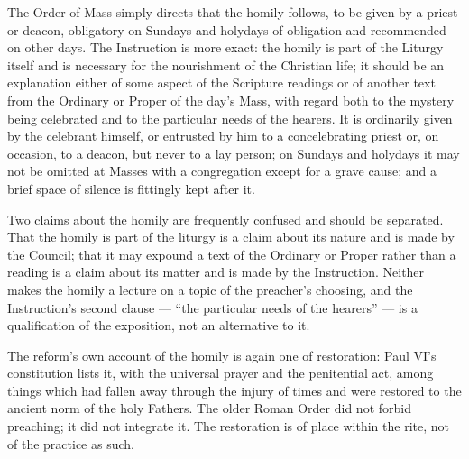 The Order of Mass simply directs that the homily follows, to be given by a priest or deacon,
obligatory on Sundays and holydays of obligation and recommended on other days. The Instruction is more exact: the homily is part of the Liturgy itself and is
necessary for the nourishment of the Christian life; it should be an explanation either of some
aspect of the Scripture readings or of another text from the Ordinary or Proper of the day's
Mass, with regard both to the mystery being celebrated and to the particular needs of the
hearers. It is ordinarily given by the celebrant himself, or entrusted by him to a
concelebrating priest or, on occasion, to a deacon, but never to a lay person; on Sundays and
holydays it may not be omitted at Masses with a congregation except for a grave cause; and a
brief space of silence is fittingly kept after it.

Two claims about the homily are frequently confused and should be separated. That the homily is
part of the liturgy is a claim about its nature and is made by the Council; that it may expound
a text of the Ordinary or Proper rather than a reading is a claim about its matter and is made
by the Instruction. Neither makes the homily a lecture on a topic of the preacher's choosing,
and the Instruction's second clause --- ``the particular needs of the hearers'' --- is a
qualification of the exposition, not an alternative to it.

The reform's own account of the homily is again one of restoration: Paul VI's constitution
lists it, with the universal prayer and the penitential act, among things which had fallen away
through the injury of times and were restored to the ancient norm of the holy Fathers. The
older Roman Order did not forbid preaching; it did not integrate it. The restoration is of
place within the rite, not of the practice as such.
